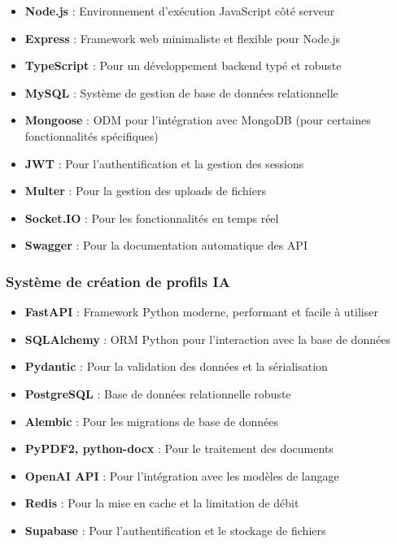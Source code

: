 \begin{itemize}
  \item \textbf{Node.js} : Environnement d'exécution JavaScript côté serveur
  
  \item \textbf{Express} : Framework web minimaliste et flexible pour Node.js
  
  \item \textbf{TypeScript} : Pour un développement backend typé et robuste
  
  \item \textbf{MySQL} : Système de gestion de base de données relationnelle
  
  \item \textbf{Mongoose} : ODM pour l'intégration avec MongoDB (pour certaines fonctionnalités spécifiques)
  
  \item \textbf{JWT} : Pour l'authentification et la gestion des sessions
  
  \item \textbf{Multer} : Pour la gestion des uploads de fichiers
  
  \item \textbf{Socket.IO} : Pour les fonctionnalités en temps réel
  
  \item \textbf{Swagger} : Pour la documentation automatique des API
\end{itemize}

\subsubsection{Système de création de profils IA}

\begin{itemize}
  \item \textbf{FastAPI} : Framework Python moderne, performant et facile à utiliser
  
  \item \textbf{SQLAlchemy} : ORM Python pour l'interaction avec la base de données
  
  \item \textbf{Pydantic} : Pour la validation des données et la sérialisation
  
  \item \textbf{PostgreSQL} : Base de données relationnelle robuste
  
  \item \textbf{Alembic} : Pour les migrations de base de données
  
  \item \textbf{PyPDF2, python-docx} : Pour le traitement des documents
  
  \item \textbf{OpenAI API} : Pour l'intégration avec les modèles de langage
  
  \item \textbf{Redis} : Pour la mise en cache et la limitation de débit
  
  \item \textbf{Supabase} : Pour l'authentification et le stockage de fichiers
\end{itemize}

